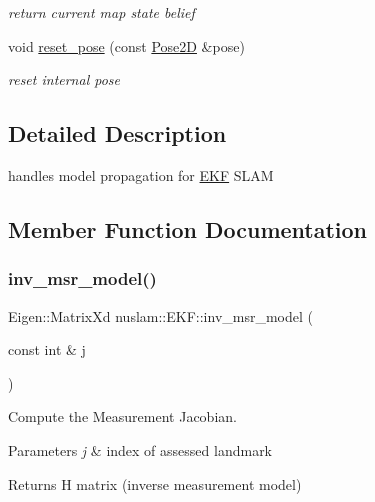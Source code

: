\begin{DoxyCompactItemize}
\begin{DoxyCompactList}\small\item\em return current map state belief \end{DoxyCompactList}\item 
\mbox{\label{classnuslam_1_1EKF_a37d5e78faa84e6a3d71197fff06d2503}} 
void \hyperlink{classnuslam_1_1EKF_a37d5e78faa84e6a3d71197fff06d2503}{reset\+\_\+pose} (const \hyperlink{structrigid2d_1_1Pose2D}{Pose2D} \&pose)
\begin{DoxyCompactList}\small\item\em reset internal pose \end{DoxyCompactList}\end{DoxyCompactItemize}


\subsection{Detailed Description}
handles model propagation for \hyperlink{classnuslam_1_1EKF}{E\+KF} S\+L\+AM 

\subsection{Member Function Documentation}
\mbox{\label{classnuslam_1_1EKF_a51b063065f405856d85fe048d736c68a}} 
\subsubsection{\texorpdfstring{inv\+\_\+msr\+\_\+model()}{inv\_msr\_model()}}
{\footnotesize\ttfamily Eigen\+::\+Matrix\+Xd nuslam\+::\+E\+K\+F\+::inv\+\_\+msr\+\_\+model (\begin{DoxyParamCaption}\item[{const int \&}]{j }\end{DoxyParamCaption})}



Compute the Measurement Jacobian. 


\begin{DoxyParams}{Parameters}
{\em j} & index of assessed landmark \\
\hline
\end{DoxyParams}
\begin{DoxyReturn}{Returns}
H matrix (inverse measurement model) 
\end{DoxyReturn}
\mbox{\label{classnuslam_1_1EKF_a6cf0259a033ba671961ea06d1737ee3c}} 
